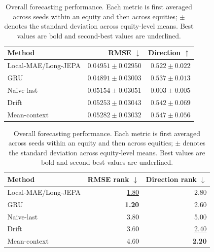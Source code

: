 \begin{table}[t]
\centering
\small
\caption{Overall forecasting performance. Each metric is first averaged across seeds within an equity and then across equities; $\pm$ denotes the standard deviation across equity-level means. Best values are bold and second-best values are underlined.}
\label{tab:main_metrics}
\begin{tabular}{lrr}
\toprule
Method & RMSE $\downarrow$ & Direction $\uparrow$ \\
\midrule
Local-MAE/Long-JEPA & \underline{$0.04951 \pm 0.02950$} & $0.522 \pm 0.022$ \\
GRU & \textbf{$0.04891 \pm 0.03003$} & $0.537 \pm 0.013$ \\
Naive-last & $0.05154 \pm 0.03051$ & $0.003 \pm 0.005$ \\
Drift & $0.05253 \pm 0.03043$ & \underline{$0.542 \pm 0.069$} \\
Mean-context & $0.05282 \pm 0.03032$ & \textbf{$0.547 \pm 0.056$} \\
\bottomrule
\end{tabular}
\par\medskip
\begin{tabular}{lrr}
\toprule
Method & RMSE rank $\downarrow$ & Direction rank $\downarrow$ \\
\midrule
Local-MAE/Long-JEPA & \underline{1.80} & 2.80 \\
GRU & \textbf{1.20} & 2.60 \\
Naive-last & 3.80 & 5.00 \\
Drift & 3.60 & \underline{2.40} \\
Mean-context & 4.60 & \textbf{2.20} \\
\bottomrule
\end{tabular}
\end{table}
